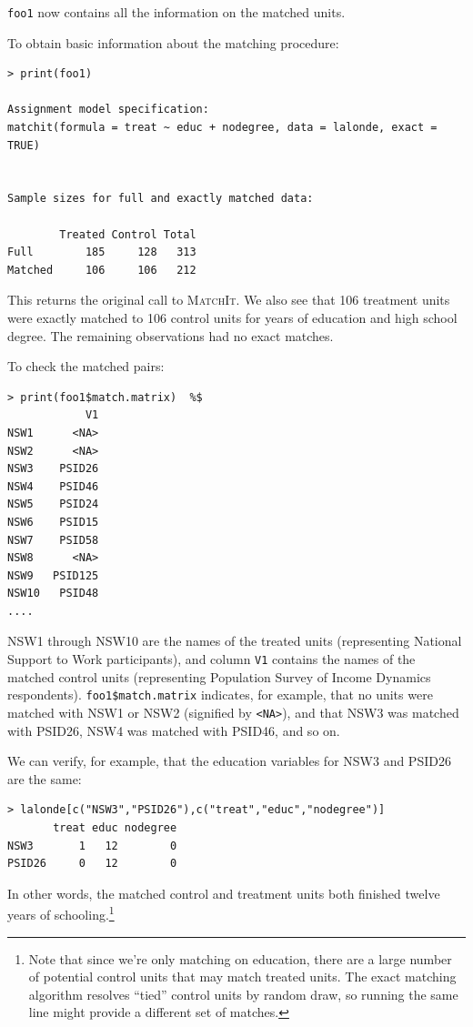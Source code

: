 \documentclass[oneside,letterpaper,titlepage]{article}
\newcommand{\MatchIt}{\textsc{MatchIt}}
\begin{document}
\texttt{foo1} now contains all the information on the matched units.  

To obtain basic information about the matching procedure: 

\begin{verbatim}
> print(foo1) 

Assignment model specification:
matchit(formula = treat ~ educ + nodegree, data = lalonde, exact = TRUE)


Sample sizes for full and exactly matched data:

        Treated Control Total
Full        185     128   313
Matched     106     106   212
\end{verbatim}

This returns the original call to \MatchIt.  We also see that 106
treatment units were exactly matched to 106 control units for years of
education and high school degree.  The remaining observations had no
exact matches.

To check the matched pairs:

\begin{verbatim}
> print(foo1$match.matrix)  %$
            V1
NSW1      <NA>
NSW2      <NA>
NSW3    PSID26
NSW4    PSID46
NSW5    PSID24
NSW6    PSID15
NSW7    PSID58
NSW8      <NA>
NSW9   PSID125
NSW10   PSID48
....
\end{verbatim}

NSW1 through NSW10 are the names of the treated units (representing
National Support to Work participants), and column
\texttt{V1} contains the names of the matched control units
(representing Population Survey of Income Dynamics respondents).
\texttt{foo1\$match.matrix} indicates, for example, that no units were
matched with NSW1 or NSW2 (signified by \texttt{<NA>}), and that NSW3
was matched with PSID26, NSW4 was matched with PSID46, and so on.  

We can verify, for example, that the education variables for NSW3 and
PSID26 are the same:

\begin{verbatim}
> lalonde[c("NSW3","PSID26"),c("treat","educ","nodegree")]
       treat educ nodegree
NSW3       1   12        0
PSID26     0   12        0
\end{verbatim}

In other words, the matched control and treatment units both finished
twelve years of schooling.\footnote{Note that since we're only
  matching on education, there are a large number of potential control
  units that may match treated units.  The exact matching algorithm
  resolves ``tied'' control units by random draw, so running the same
  line might provide a different set of matches.}
\end{document}
